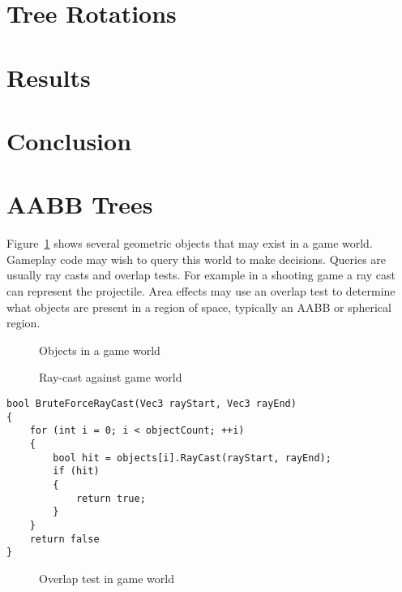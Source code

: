 \documentclass{article}
\begin{document}
\section{Tree Rotations}

\section{Results}

\section{Conclusion}


\section{AABB Trees}
Figure~\ref{fig:loose} shows several geometric objects that may exist in a game world. Gameplay code may wish to query this world to make decisions. Queries are usually ray casts and overlap tests. For example in a shooting game a ray cast can represent the projectile. Area effects may use an overlap test to determine what objects are present in a region of space, typically an AABB or spherical region.

\begin{figure}
	\begin{center}
		
	\end{center}
	\caption{Objects in a game world}
	\label{fig:loose}
\end{figure}

\begin{figure}
	\begin{center}
		
	\end{center}
	\caption{Ray-cast against game world}
	\label{fig:raycast}
\end{figure}

\begin{lstlisting}[caption={Brute-force ray-casting}, label={lst:brute_ray}, float]
bool BruteForceRayCast(Vec3 rayStart, Vec3 rayEnd)
{
	for (int i = 0; i < objectCount; ++i)
	{
		bool hit = objects[i].RayCast(rayStart, rayEnd);
		if (hit)
		{
			return true;
		}
	}
	return false
}
\end{lstlisting}

\begin{figure}
	\begin{center}
		
	\end{center}
	\caption{Overlap test in game world}
	\label{fig:overlap}
\end{figure}
\end{document}

